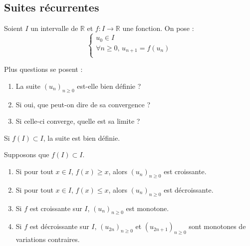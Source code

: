 \documentclass[a4paper,10pt]{report}
\begin{document}
\subsection{Suites récurrentes}

\noindent Soient $I$ un intervalle de $\mathbb{R}$ et $f : I \rightarrow \mathbb{R}$ une fonction. On pose :
$$ \left\lbrace \begin{array}{l}
u_0 \in I \\
\forall n \geq 0, \, u_{n+1} = f(u_n) \\
\end{array}\right.$$

\noindent Plus questions se posent :

\begin{enumerate}
\item La suite $(u_n)_{n \geq 0}$ est-elle bien définie ?
\item Si oui, que peut-on dire de sa convergence ?
\item Si celle-ci converge, quelle est sa limite ?
\end{enumerate}

\medskip

\begin{prop} Si $f(I) \subset I$, la suite est bien définie.
\end{prop}


\begin{prop} Supposons que $f(I) \subset I$.

\begin{enumerate}
\item Si pour tout $x \in I$, $f(x) \geq x$, alors $(u_n)_{n \geq 0}$ est croissante.
\item Si pour tout $x \in I$, $f(x) \leq x$, alors $(u_n)_{n \geq 0}$ est décroissante.
\item Si $f$ est croissante sur $I$, $(u_n)_{n \geq 0}$ est monotone.
\item Si $f$ est décroissante sur $I$, $(u_{2n})_{n \geq 0}$ et $(u_{2n+1})_{n \geq 0}$ sont monotones de variations contraires.
\end{enumerate}
\end{prop}
\end{document}
